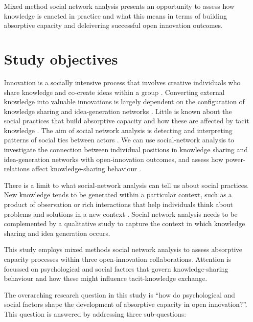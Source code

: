 {{Mixed method social network analysis presents an opportunity to assess how knowledge is enacted in practice and what this means in terms of building absorptive capacity and deleivering successful open innovation outcomes. \medskip 

\section{Study objectives}

Innovation is a socially intensive process that involves creative individuals who share knowledge and co-create ideas within a group \citep{leonard1998role}. Converting external knowledge into valuable innovations is largely dependent on the configuration of knowledge sharing and idea-generation networks \citep{tortoriello2010activating}. Little is known about the social practices that build absorptive capacity and how these are affected by tacit knowledge \citep{tortoriello2015social,lichtenthaler2016absorptive}. The aim of social network analysis is detecting and interpreting patterns of social ties between actors \citep{de2011exploratory}. We can use social-network analysis to investigate the connection between individual positions in knowledge sharing and idea-generation networks with open-innovation outcomes, and assess how power-relations affect knowledge-sharing behaviour \citep{van2010use,marabelli2014knowing}. \medskip

There is a limit to what social-network analysis can tell us about social practices. New knowledge tends to be generated within a particular context, such as a product of observation or rich interactions that help individuals think about problems and solutions in a new context \citep{nonaka1994dynamic,wenger2000communities,cross2015investing}. Social network analysis needs to be complemented by a qualitative study to capture the context in which knowledge sharing and idea generation occurs. \medskip 

This study employs mixed methods social network analysis to assess absorptive capacity processes within three open-innovation collaborations. Attention is focussed on psychological and social factors that govern knowledge-sharing behaviour and how these might influence tacit-knowledge exchange. \medskip

The overarching research question in this study is \enquote{how do psychological and social factors shape the development of absorptive capacity in open innovation?}. This question is answered by addressing three sub-questions:\medskip

}}
